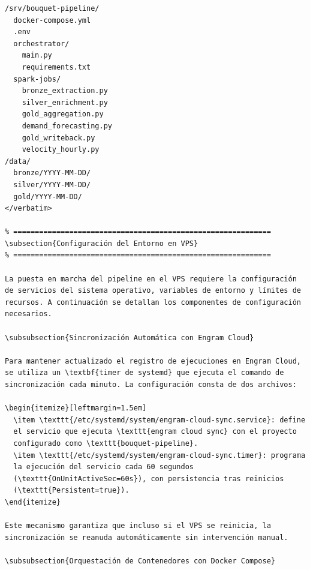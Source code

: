 \begin{verbatim}
/srv/bouquet-pipeline/
  docker-compose.yml
  .env
  orchestrator/
    main.py
    requirements.txt
  spark-jobs/
    bronze_extraction.py
    silver_enrichment.py
    gold_aggregation.py
    demand_forecasting.py
    gold_writeback.py
    velocity_hourly.py
/data/
  bronze/YYYY-MM-DD/
  silver/YYYY-MM-DD/
  gold/YYYY-MM-DD/
</verbatim>

% ============================================================
\subsection{Configuración del Entorno en VPS}
% ============================================================

La puesta en marcha del pipeline en el VPS requiere la configuración
de servicios del sistema operativo, variables de entorno y límites de
recursos. A continuación se detallan los componentes de configuración
necesarios.

\subsubsection{Sincronización Automática con Engram Cloud}

Para mantener actualizado el registro de ejecuciones en Engram Cloud,
se utiliza un \textbf{timer de systemd} que ejecuta el comando de
sincronización cada minuto. La configuración consta de dos archivos:

\begin{itemize}[leftmargin=1.5em]
  \item \texttt{/etc/systemd/system/engram-cloud-sync.service}: define
  el servicio que ejecuta \texttt{engram cloud sync} con el proyecto
  configurado como \texttt{bouquet-pipeline}.
  \item \texttt{/etc/systemd/system/engram-cloud-sync.timer}: programa
  la ejecución del servicio cada 60 segundos
  (\texttt{OnUnitActiveSec=60s}), con persistencia tras reinicios
  (\texttt{Persistent=true}).
\end{itemize}

Este mecanismo garantiza que incluso si el VPS se reinicia, la
sincronización se reanuda automáticamente sin intervención manual.

\subsubsection{Orquestación de Contenedores con Docker Compose}


\end{verbatim}
